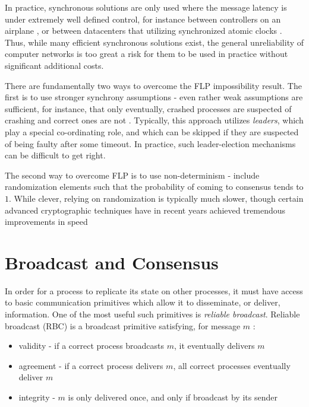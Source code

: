 In practice, synchronous solutions are only used where the message latency is under 
extremely well defined control, for instance between controllers on an airplane \cite{hoyme1993safebus},
or between datacenters that utilizing synchronized atomic clocks \cite{corbett2013spanner}.
Thus, while many efficient synchronous solutions exist,
the general unreliability of computer networks is too great a risk for them to be used in practice
without significant additional costs.

There are fundamentally two ways to overcome the FLP impossibility result.
The first is to use stronger synchrony assumptions - 
even rather weak assumptions are sufficient, 
for instance, that only eventually, 
crashed processes are suspected of crashing and correct ones are not \cite{chandra1996unreliable}.
Typically, this approach utilizes \emph{leaders}, 
which play a special co-ordinating role, 
and which can be skipped if they are suspected of being faulty after some timeout.
In practice, such leader-election mechanisms can be difficult to get right.

The second way to overcome FLP is to use non-determinism - 
include randomization elements such that
the probability of coming to consensus tends to $1$.
While clever, relying on randomization is typically much slower, 
though certain advanced cryptographic techniques have in recent years
achieved tremendous improvements in speed \cite{honeybadger}


\section{Broadcast and Consensus}

In order for a process to replicate its state on other processes, 
it must have access to basic communication primitives which allow it to disseminate, or deliver, information.
One of the most useful such primitives is \emph{reliable broadcast}.
Reliable broadcast (RBC) is a broadcast primitive satisfying, for message $m$ \cite{chandra1996unreliable}:

\begin{itemize}
\item validity - if a correct process broadcasts $m$, it eventually delivers $m$
\item agreement - if a correct process delivers $m$, all correct processes eventually deliver $m$
\item integrity - $m$ is only delivered once, and only if broadcast by its sender
\end{itemize}

